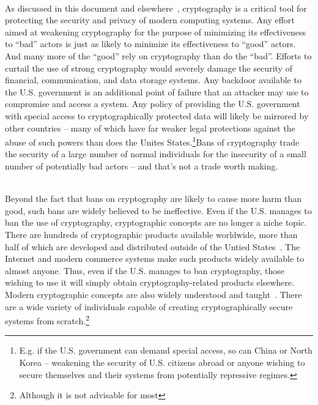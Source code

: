 \begin{packed_desc}
\item[More Harm Than Good] \hfill \\ As discussed in this document and
  elsewhere~\cite{abelson2015}, cryptography is a critical tool for
  protecting the security and privacy of modern computing systems. Any
  effort aimed at weakening cryptography for the purpose of minimizing
  its effectiveness to ``bad'' actors is just as likely to minimize
  its effectiveness to ``good'' actors. And many more of the ``good''
  rely on cryptography than do the ``bad''. Efforts to curtail the use
  of strong cryptography would severely damage the security of
  financial, communication, and data storage systems. Any backdoor
  available to the U.S. government is an additional point of failure
  that an attacker may use to compromise and access a system. Any
  policy of providing the U.S. government with special access to
  cryptographically protected data will likely be mirrored by other
  countries -- many of which have far weaker legal protections against
  the abuse of such powers than does the Unites
  States.\footnote{E.g. if the U.S. government can demand special
    access, so can China or North Korea -- weakening the security of
    U.S. citizens abroad or anyone wishing to secure themselves and
    their systems from potentially repressive regimes.}Bans of
  cryptography trade the security of a large number of normal
  individuals for the insecurity of a small number of potentially bad
  actors -- and that's not a trade worth making.
\item[Ineffectiveness] \hfill \\ Beyond the fact that bans on
  cryptography are likely to cause more harm than good, such bans are
  widely believed to be ineffective. Even if the U.S. manages to ban
  the use of cryptography, cryptographic concepts are no longer a
  niche topic. There are hundreds of cryptographic products available
  worldwide, more than half of which are developed and distributed
  outside of the Untied States~\cite{schneier2016}. The Internet and
  modern commerce systems make such products widely available to
  almost anyone. Thus, even if the U.S. manages to ban cryptography,
  those wishing to use it will simply obtain cryptography-related
  products elsewhere. Modern cryptographic concepts are also widely
  understood and taught~\cite{schneier2010crypto}. There are a wide
  variety of individuals capable of creating cryptographically secure
  systems from scratch.\footnote{Although it is not advisable for most
}
\end{packed_desc}
